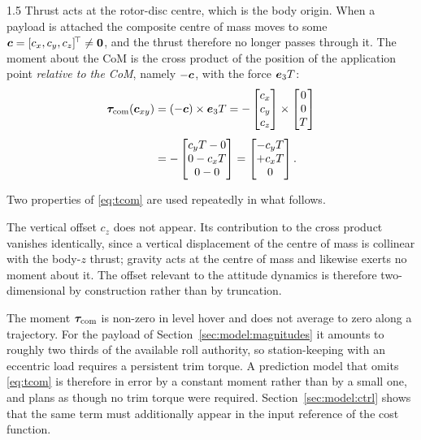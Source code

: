 \begin{spacing}{1.5}
Thrust acts at the rotor-disc centre, which is the body origin. When a payload is
attached the composite centre of mass moves to some
$\bm{c} = [c_x, c_y, c_z]^{\!\top} \neq \bm{0}$, and the thrust therefore no longer
passes through it. The moment about the CoM is the cross product of the position
of the application point \emph{relative to the CoM}, namely $-\bm{c}$, with the
force $\bm{e}_3 T$:
\begin{align}
\bm{\tau}_{\mathrm{com}}(\bm{c}_{xy}) &= (-\bm{c}) \times \bm{e}_3 T
= -\begin{bmatrix} c_x \\ c_y \\ c_z \end{bmatrix}
\times \begin{bmatrix} 0 \\ 0 \\ T \end{bmatrix} \nonumber \\[4pt]
&= -\begin{bmatrix} c_y T - 0 \\ 0 - c_x T \\ 0 - 0 \end{bmatrix}
= \begin{bmatrix} -c_y T \\ +c_x T \\ 0 \end{bmatrix}.
\label{eq:tcom}
\end{align}

Two properties of \eqref{eq:tcom} are used repeatedly in what follows.

The vertical offset $c_z$ does not appear. Its contribution to the cross product
vanishes identically, since a vertical displacement of the centre of mass is
collinear with the body-$z$ thrust; gravity acts at the centre of mass and
likewise exerts no moment about it. The offset relevant to the attitude dynamics
is therefore two-dimensional by construction rather than by truncation.

The moment $\bm{\tau}_{\mathrm{com}}$ is non-zero in level hover and does not average to zero along a
trajectory. For the payload of Section~\ref{sec:model:magnitudes} it amounts to
roughly two thirds of the available roll authority, so station-keeping with an
eccentric load requires a persistent trim torque. A prediction model that omits
\eqref{eq:tcom} is therefore in error by a constant moment rather than by a small
one, and plans as though no trim torque were required.
Section~\ref{sec:model:ctrl} shows that the same term must additionally appear in
the input reference of the cost function.


\end{spacing}
